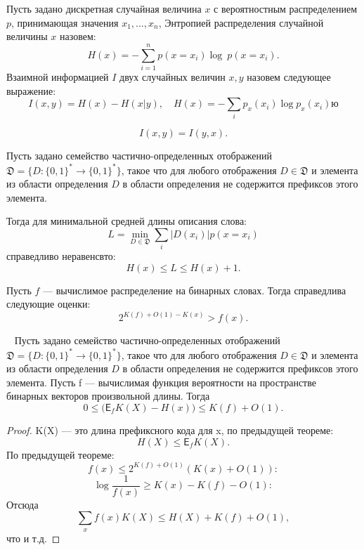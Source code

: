 \documentclass[../main.tex]{subfiles}
\begin{document}
\begin{definition}
Пусть задано дискретная случайная величина $x$ с вероятностным распределением $p$, принимающая значения $x_1, \dots, x_n$,
Энтропией распределения случайной величины $x$ назовем:
\[
	H(x) = -\sum_{i=1}^n p(x = x_i) \log~p(x = x_i).
\]
Взаимной информацией $I$ двух случайных величин $x,y$ назовем следующее выражение:
\[
	I(x,y) = H(x) - H(x|y), \quad H(x) = - \sum_{i} p_x(x_i) \log p_x(x_i)ю
\]
\end{definition}


\[
	I(x,y) = I(y,x).
\]

\begin{theorem}
Пусть задано семейство частично-определенных отображений $\mathfrak{D} = \{D: \{0,1\}^{*} \to \{0,1\}^{*}\}$,
такое что для любого отображения $D \in \mathfrak{D}$ и элемента из области определения $D$ в области определения не содержится префиксов этого элемента.

Тогда для минимальной средней длины описания слова:
\[
	L = \min_{D \in \mathfrak{D}}\sum_{i}|D(x_i)|p(x = x_i)
\] 
справедливо неравенсвто:
\[
	H(x) \leq L \leq H(x)+1.
\]
\end{theorem}

\begin{theorem}
Пусть $f$ --- вычислимое распределение на бинарных словах. Тогда справедлива следующие оценки:
\[
	2^{K(f) + O(1) - K(x)} > f(x).
\]
\end{theorem}
\begin{theorem}~\cite{grun_ks}
Пусть задано семейство частично-определенных отображений $\mathfrak{D} = \{D: \{0,1\}^{*} \to \{0,1\}^{*}\}$,
такое что для любого отображения $D \in \mathfrak{D}$ и элемента из области определения $D$ в области определения не содержится префиксов этого элемента.
Пусть f --- вычислимая функция вероятности на пространстве бинарных векторов произвольной длины. Тогда 
\[
	0 \leq \bigl(\mathsf{E}_f K(X) - H(x) \bigr) \leq K(f)  + O(1).
\]
\end{theorem}

\begin{proof}
K(X) --- это длина префиксного кода для x, по предыдущей теореме:
\[
	H(X) \leq \mathsf{E}_f K(X).
\]
По предыдущей теореме:
\[
	f(x) \leq 2^{K(f) + O(1)} (K(x) + O(1)):
\]
\[
	 \log\frac{1}{f(x)} \geq K(x) - K(f) - O(1):
\]
Отсюда 
\[
	\sum_{x} f(x) K(X) \leq H(X) + K(f)  + O(1), 
\]
что и т.д.

\end{proof}
\end{document}

